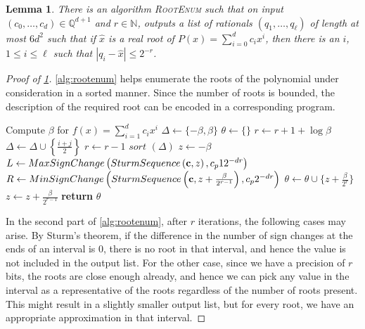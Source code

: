 \documentclass[10pt,a4paper]{amsart}
\newtheorem{lemma}{Lemma}
\newcommand{\N}{\mathbb{N}}
\newcommand{\Q}{\mathbb{Q}}
\begin{document}
\begin{lemma}\label{lem:rootenum}
  There is an algorithm \textsc{RootEnum} such that on input
  $(c_0,\dots,c_d)\in\Q^{d+1}$ and $r\in\N$, outputs a list of
  rationals $(q_1,\dots,q_\ell)$ of length at most $6d^2$ such that if
  $\hat{x}$ is a real root of $P(x)=\sum_{i=0}^d c_i x^i$, then there
  is an $i$, $1 \le i \le \ell$ such that $|q_i - \hat{x}|\le 2^{-r}$.
\end{lemma}

\begin{proof}[Proof of \cref{lem:rootenum}]
	\cref{alg:rootenum} helps enumerate the roots of the polynomial
	under consideration in a sorted manner. Since the number of roots is
	bounded, the description of the required root can be encoded in a
	corresponding program.
	\begin{algorithm}[H]
		\caption{Root enumeration}\label{alg:rootenum}
		\begin{algorithmic}[1]
			\State Compute $\beta$ for $f(x)=\sum_{i=1}^dc_ix^i$
			\State $\Delta\gets\{-\beta,\beta\}$ 
			\State $\theta\gets\{\}$ 
			\State $r\gets r+1+\log\beta$ 
			\State $\Delta\gets\Delta\cup\left\{\frac{i+j}{2}\right\}$
			\EndWhile
			\State $r\gets r-1$
			\EndWhile
			\Statex
			\State $\textit{sort }(\Delta)$
			\State $z\gets-\beta$
			\State $L \gets
			\textsc{MaxSignChange}\left(\textsc{SturmSequence}\left(\mathbf{c},z\right),c_p
			1      2^{-dr} \right)$
			\State $R \gets
			\textsc{MinSignChange}\left(\textsc{SturmSequence}\left(\mathbf{c},z+\frac{\beta}{2^{r-1}}\right),
			c_p 2^{-dr}\right)$
			\State $\theta\gets\theta\cup \{z+\frac{\beta}{2^r}\}$
			\EndIf
			\State $z\gets z+\frac{\beta}{2^{r-1}}$
			\EndWhile
			\State \textbf{return} $\theta$
			\EndProcedure
		\end{algorithmic}
	\end{algorithm}
	In the second part of \cref{alg:rootenum}, after $r$ iterations, the
	following cases may arise. By Sturm's theorem, if the difference in
	the number of sign changes at the ends of an interval is $0$, there
	is no root in that interval, and hence the value is not included in
	the output list. For the other case, since we have a precision of
	$r$ bits, the roots are close enough already, and hence we can pick
	any value in the interval as a representative of the roots
	regardless of the number of roots present. This might result in a
	slightly smaller output list, but for every root, we have an
	appropriate approximation in that interval.
	

\end{proof}
\end{document}
